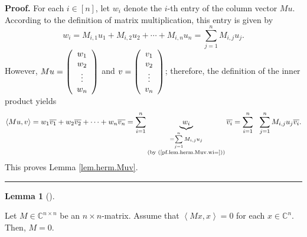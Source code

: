\documentclass[numbers=enddot,12pt,final,onecolumn,notitlepage]{scrartcl}%
\numberwithin{exer}{subsection}
\theoremstyle{definition}
\newtheorem{lem}[theo]{Lemma}
\newenvironment{lemma}[1][]
{\begin{lem}[#1]\begin{leftbar}}
{\end{leftbar}\end{lem}}
\newenvironment{proof}[1][Proof]{\noindent\textbf{#1.} }{\ \rule{0.5em}{0.5em}}
\let\sumnonlimits\sum
\renewcommand{\sum}{\sumnonlimits\limits}
\begin{document}
\begin{proof}
For each $i\in\left[  n\right]  $, let $w_{i}$ denote the $i$-th entry of the
column vector $Mu$. According to the definition of matrix multiplication, this
entry is given by%
\begin{equation}
w_{i}=M_{i,1}u_{1}+M_{i,2}u_{2}+\cdots+M_{i,n}u_{n}=\sum_{j=1}^{n}M_{i,j}%
u_{j}. \label{pf.lem.herm.Muv.wi=}%
\end{equation}
However, $Mu=\left(
\begin{array}
[c]{c}%
w_{1}\\
w_{2}\\
\vdots\\
w_{n}%
\end{array}
\right)  $ and $v=\left(
\begin{array}
[c]{c}%
v_{1}\\
v_{2}\\
\vdots\\
v_{n}%
\end{array}
\right)  $; therefore, the definition of the inner product yields%
\[
\left\langle Mu,v\right\rangle =w_{1}\overline{v_{1}}+w_{2}\overline{v_{2}%
}+\cdots+w_{n}\overline{v_{n}}=\sum_{i=1}^{n}\underbrace{w_{i}}%
_{\substack{=\sum_{j=1}^{n}M_{i,j}u_{j}\\\text{(by (\ref{pf.lem.herm.Muv.wi=}%
))}}}\overline{v_{i}}=\sum_{i=1}^{n}\ \ \sum_{j=1}^{n}M_{i,j}u_{j}%
\overline{v_{i}}.
\]
This proves Lemma \ref{lem.herm.Muv}.
\end{proof}

\begin{lemma}
\label{lem.herm.M=0}Let $M\in\mathbb{C}^{n\times n}$ be an $n\times n$-matrix.
Assume that $\left\langle Mx,x\right\rangle =0$ for each $x\in\mathbb{C}^{n}$.
Then, $M=0$.
\end{lemma}
\end{document}
